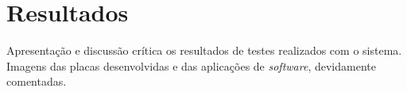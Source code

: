 \chapter{Resultados}

Apresentação e discussão crítica os resultados de testes realizados com o sistema.
Imagens das placas desenvolvidas e das aplicações de \textit{software}, devidamente comentadas.
